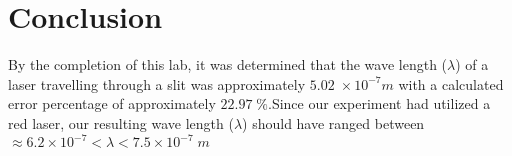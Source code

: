 \documentclass{article}
\begin{document}
\section*{Conclusion} {
  By the completion of this lab, it was determined that the wave length ($\lambda$) of a laser travelling through a slit was approximately $5.02\;\times 10^{-7}m$ with a calculated error percentage of approximately $22.97\;\%$.\newline\newline Since our experiment had utilized a red laser, our resulting wave length ($\lambda$) should have ranged between $\approx 6.2 \times 10^{-7} < \lambda < 7.5 \times 10^{-7}\;m$
 }
\end{document}
